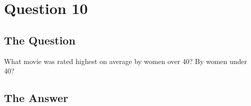 \section{Question 10}

\subsection{The Question}

\begin{flushleft}

What movie was rated highest on average by women over 40? By
women under 40?

\end{flushleft}
\subsection{The Answer}


